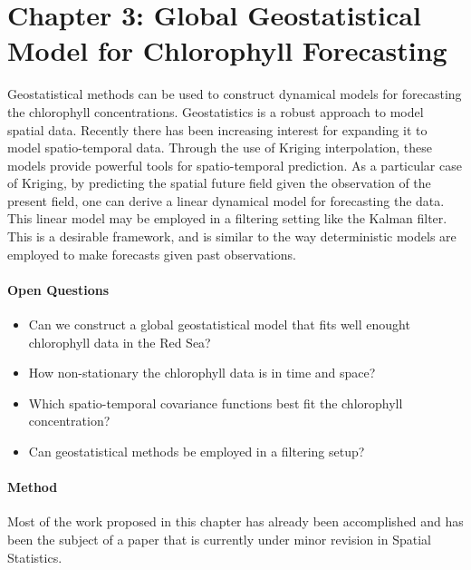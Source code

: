 \section{Chapter 3: Global Geostatistical Model for Chlorophyll Forecasting}

Geostatistical methods can be used to construct dynamical models for
forecasting the chlorophyll concentrations. Geostatistics is a robust approach to
model spatial data.  Recently there has been increasing interest for expanding
it to model spatio-temporal data. Through the use of Kriging interpolation,
these models provide powerful tools for spatio-temporal prediction. As a
particular case of Kriging, by predicting the spatial future field given the
observation of the present field, one can derive a linear dynamical model for
forecasting the data. This linear model may be employed in a filtering setting
like the Kalman filter. This is a desirable framework, and is similar to the
way deterministic models are employed to make forecasts given past
observations. 

\paragraph{Open Questions}

\begin{itemize}

\item Can we construct a global geostatistical model that fits well enought
chlorophyll data in the Red Sea?

\item How non-stationary the chlorophyll data is in time and space?

\item Which spatio-temporal covariance functions best fit the chlorophyll concentration?

\item Can geostatistical methods be employed in a filtering setup?

\end{itemize}

\paragraph{Method} 
\mbox{}

Most of the work proposed in this chapter has already been accomplished and has
been the subject of a paper that is currently under minor revision in Spatial 
Statistics.


